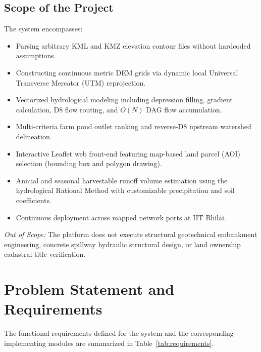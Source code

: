 \documentclass[manuscript,screen,review]{acmart}
\begin{document}
\subsection{Scope of the Project}
The system encompasses:
\begin{itemize}[noitemsep]
    \item Parsing arbitrary KML and KMZ elevation contour files without hardcoded assumptions.
    \item Constructing continuous metric DEM grids via dynamic local Universal Transverse Mercator (UTM) reprojection.
    \item Vectorized hydrological modeling including depression filling, gradient calculation, D8 flow routing, and $O(N)$ DAG flow accumulation.
    \item Multi-criteria farm pond outlet ranking and reverse-D8 upstream watershed delineation.
    \item Interactive Leaflet web front-end featuring map-based land parcel (AOI) selection (bounding box and polygon drawing).
    \item Annual and seasonal harvestable runoff volume estimation using the hydrological Rational Method with customizable precipitation and soil coefficients.
    \item Continuous deployment across mapped network ports at IIT Bhilai.
\end{itemize}
\emph{Out of Scope:} The platform does not execute structural geotechnical embankment engineering, concrete spillway hydraulic structural design, or land ownership cadastral title verification.

\section{Problem Statement and Requirements}
\label{sec:requirements}

The functional requirements defined for the system and the corresponding implementing modules are summarized in Table~\ref{tab:requirements}.
\end{document}
